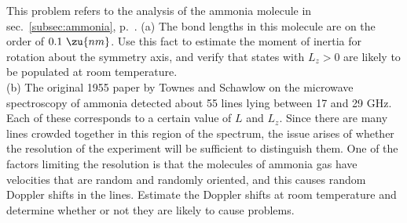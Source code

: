 This problem refers to the analysis of the ammonia molecule in sec.~\ref{subsec:ammonia}, p.~\pageref{subsec:ammonia}.
(a) The bond lengths in this molecule are on the order of $0.1\ \zu{nm}$. Use this fact to estimate the moment of
inertia for rotation about the symmetry axis, and verify that states with $L_z>0$ are likely to be populated at
room temperature.\\
(b) The original 1955 paper by Townes and Schawlow on the microwave spectroscopy of ammonia detected about 55
lines lying between 17 and 29 GHz. Each of these corresponds to a certain value of $L$ and $L_z$. Since there
are many lines crowded together in this region of the spectrum, the issue arises of whether the resolution
of the experiment will be sufficient to distinguish them. One of the factors limiting the resolution is that
the molecules of ammonia gas have velocities that are random and randomly oriented, and this causes random
Doppler shifts in the lines. Estimate the Doppler shifts at room temperature and determine whether or not they
are likely to cause problems.
